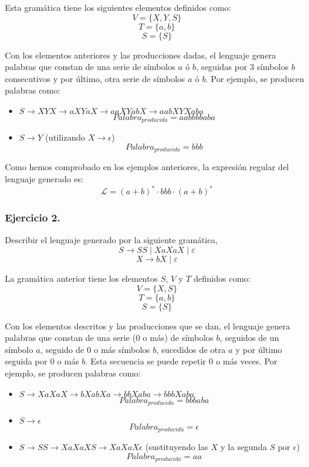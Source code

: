 \documentclass[11pt,a4paper]{article}
\begin{document}
Esta gramática tiene los siguientes elementos definidos como:
	\[V=\{X,Y,S\}\]
	\[T=\{a,b\}\]
	\[S=\{S\}\]
	
Con los elementos anteriores y las producciones dadas, el lenguaje genera palabras que constan de una serie de símbolos $a$ ó $b$, seguidas por 3 símbolos $b$ consecutivos y por último, otra serie de símbolos $a$ ó $b$. Por ejemplo, se producen palabras como:

	\begin{itemize}
	\item $S\rightarrow XYX\rightarrow aXYaX\rightarrow aaXYabX \rightarrow aabXYXaba$
	\[Palabra_{producida}=aabbbbaba\]
	\item $S\rightarrow Y$ (utilizando $X\rightarrow \epsilon$)
	\[Palabra_{producida}=bbb\]
	\end{itemize}
	
Como hemos comprobado en los ejemplos anteriores, la expresión regular del lenguaje generado es:
	\[\mathcal{L}=(a+b)^{*}\cdot bbb\cdot (a+b)^{*}\]

\subsubsection{Ejercicio 2.} Describir el lenguaje generado por la siguiente gramática,\\
	\[S\rightarrow SS \mid XaXaX \mid \varepsilon \]
	\[X\rightarrow bX \mid \varepsilon\]
	
La gramática anterior tiene los elementos $S$, $V$ y $T$ definidos como:
	\[V=\{X,S\}\]
	\[T=\{a,b\}\]
	\[S=\{S\}\]
	
Con los elementos descritos y las producciones que se dan, el lenguaje genera palabras que constan de una serie (0 o más) de símbolos $b$, seguidos de un símbolo $a$, seguido de 0 o más símbolos $b$, sucedidos de otra $a$ y por último seguida por 0 o más $b$. Esta secuencia se puede repetir 0 o más veces. Por ejemplo, se producen palabras como:

	\begin{itemize}
	\item $S\rightarrow XaXaX\rightarrow bXabXa\rightarrow bbXaba\rightarrow bbbXaba$
	\[Palabra_{producida}=bbbaba\]
	\item $S\rightarrow \epsilon$
	\[Palabra_{producida}=\epsilon\]
	\item $S\rightarrow SS\rightarrow XaXaXS\rightarrow XaXaX\epsilon$ (sustituyendo las $X$ y la segunda $S$ por $\epsilon$)
	\[Palabra_{producida}=aa\]
	\end{itemize}
	
\end{document}

